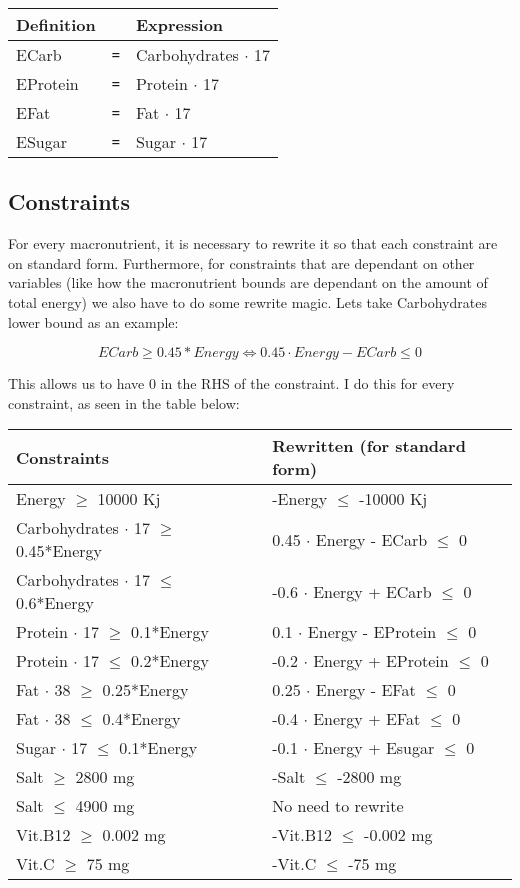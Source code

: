\documentclass[margin=0.3in]{article}
\begin{document}
\begin{center}
\begin{tabular}{lll}
\hline
\textbf{Definition} &  & \textbf{Expression}\\
\hline
ECarb & \verb~=~ & Carbohydrates $\cdot$ 17\\
\hline
EProtein & \verb~=~ & Protein $\cdot$ 17\\
\hline
EFat & \verb~=~ & Fat $\cdot$ 17\\
\hline
ESugar & \verb~=~ & Sugar $\cdot$ 17\\
\hline
\end{tabular}
\end{center}

\subsection{Constraints}
\label{sec-1-3}
For every macronutrient, it is necessary to rewrite it so that each constraint are on standard form. Furthermore, for constraints that are dependant on other variables (like how the macronutrient bounds are dependant on the amount of total energy) we also have to do some rewrite magic. Lets take Carbohydrates lower bound as an example:


$$ ECarb \geq 0.45*Energy \Leftrightarrow 0.45 \cdot Energy-ECarb \leq 0 $$


This allows us to have 0 in the RHS of the constraint. I do this for every constraint, as seen in the table below:

\begin{center}
\begin{tabular}{l|l}
\textbf{Constraints} & \textbf{Rewritten (for standard form)}\\
\hline
Energy $\ge$ 10000 Kj & -Energy $\le$ -10000 Kj\\
\hline
Carbohydrates $\cdot$ 17 $\ge$ 0.45*Energy & 0.45 $\cdot$ Energy - ECarb $\le$ 0\\
\hline
Carbohydrates $\cdot$ 17 $\le$ 0.6*Energy & -0.6 $\cdot$ Energy + ECarb $\le$ 0\\
\hline
Protein $\cdot$ 17 $\ge$ 0.1*Energy & 0.1 $\cdot$ Energy - EProtein $\le$ 0\\
\hline
Protein $\cdot$ 17 $\le$ 0.2*Energy & -0.2 $\cdot$ Energy + EProtein $\le$ 0\\
\hline
Fat $\cdot$ 38 $\ge$ 0.25*Energy & 0.25 $\cdot$ Energy - EFat $\le$ 0\\
\hline
Fat $\cdot$ 38 $\le$ 0.4*Energy & -0.4 $\cdot$ Energy + EFat $\le$ 0\\
\hline
Sugar $\cdot$ 17 $\le$ 0.1*Energy & -0.1 $\cdot$ Energy + Esugar $\le$ 0\\
\hline
Salt $\ge$ 2800 mg & -Salt $\le$ -2800 mg\\
\hline
Salt $\le$ 4900 mg & No need to rewrite\\
\hline
Vit.B12 $\ge$ 0.002 mg & -Vit.B12 $\le$ -0.002 mg\\
\hline
Vit.C $\ge$ 75 mg & -Vit.C $\le$ -75 mg\\
\hline
\end{tabular}
\end{center}
\end{document}
